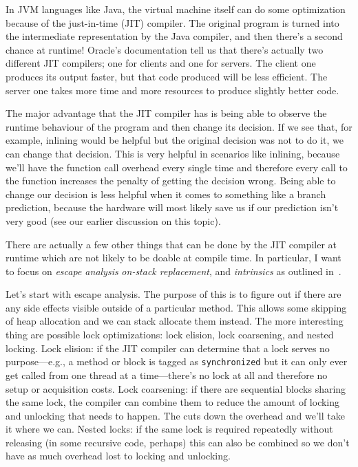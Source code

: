 In JVM languages like Java, the virtual machine itself can do some optimization because of the just-in-time (JIT) compiler. The original program is turned into the intermediate representation by the Java compiler, and then there's a second chance at runtime! Oracle's documentation tell us that there's actually two different JIT compilers; one for clients and one for servers. The client one produces its output faster, but that code produced will be less efficient. The server one takes more time and more resources to produce slightly better code.

The major advantage that the JIT compiler has is being able to observe the runtime behaviour of the program and then change its decision. If we see that, for example, inlining would be helpful but the original decision was not to do it, we can change that decision. This is very helpful in scenarios like inlining, because we'll have the function call overhead every single time and therefore every call to the function increases the penalty of getting the decision wrong. Being able to change our decision is less helpful when it comes to something like a branch prediction, because the hardware will most likely save us if our prediction isn't very good (see our earlier discussion on this topic).

There are actually a few other things that can be done by the JIT compiler at runtime which are not likely to be doable at compile time. In particular, I want to focus on \textit{escape analysis} \textit{on-stack replacement}, and \textit{intrinsics} as outlined in~\cite{escape}.

Let's start with escape analysis. The purpose of this is to figure out if there are any side effects visible outside of a particular method. This allows some skipping of heap allocation and we can stack allocate them instead. The more interesting thing are possible lock optimizations: lock elision, lock coarsening, and nested locking. Lock elision: if the JIT compiler can determine that a lock serves no purpose---e.g., a method or block is tagged as \texttt{synchronized} but it can only ever get called from one thread at a time---there's no lock at all and therefore no setup or acquisition costs.  Lock coarsening: if there are sequential blocks sharing the same lock, the compiler can combine them to reduce the amount of locking and unlocking that needs to happen. The cuts down the overhead and we'll take it where we can. Nested locks: if the same lock is required repeatedly without releasing (in some recursive code, perhaps) this can also be combined so we don't have as much overhead lost to locking and unlocking.

